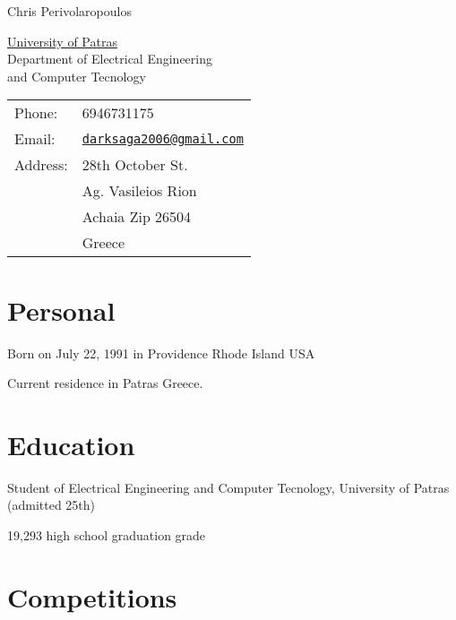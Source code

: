 \documentclass[letterpaper]{article}
\makeatletter
\def\name{Chris Perivolaropoulos}
\def\mail{darksaga2006@gmail.com}
\renewenvironment{itemize}{
  \begin{list}{}{
      \setlength{\leftmargin}{1.5em}
    }
  }{
  \end{list}
}
\makeatother
\begin{document}
{\huge \name}


\vspace{0.25in}

\begin{minipage}{0.45\linewidth}
  \href{http://www.upartas.gr/}{University of Patras} \\
  Department of Electrical Engineering\\ and Computer Tecnology \\
\end{minipage}
\begin{minipage}{0.45\linewidth}
  \begin{tabular}{ll}
    Phone:   & 6946731175 \\
    Email:   & \href{mailto:\mail}{\tt \mail} \\
    Address: & 28th October St.\\
    & Ag. Vasileios Rion \\
    &Achaia Zip 26504 \\
    &Greece\\
  \end{tabular}
\end{minipage}


\section*{Personal}

\begin{itemize}
\item Born on July 22, 1991 in Providence Rhode Island USA
\item Current residence in Patras Greece.
\end{itemize}


\section*{Education}

\begin{itemize}
\item Student of Electrical Engineering and Computer Tecnology,
  University of Patras (admitted 25th)
\item 19,293 high school graduation grade
\end{itemize}

\section*{Competitions}
\end{document}
